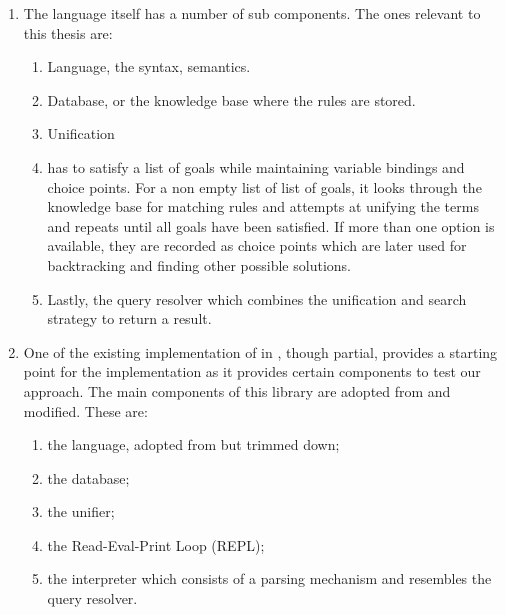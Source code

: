 \documentclass[thesis-solanki.tex]{subfiles}
\begin{document}
\begin{enumerate}
\item {}

The language itself has a number of sub components.
The ones relevant to this thesis are:
\begin{enumerate}
\item Language, the syntax, semantics.

\item Database, or the knowledge base where the rules are stored.

\item Unification

\item
   has to satisfy a list of goals while maintaining variable bindings and choice points.
  For a non empty list of list of goals, it looks through the knowledge base for matching rules and attempts at
  unifying the terms and repeats until all goals have been satisfied.
  If more than one option is available, they are recorded as choice points which are later used for backtracking
  and finding other possible solutions.

\item
  Lastly, the query resolver which combines the unification and search strategy to return a result.
\end{enumerate}

\item {} \cite{prolog-lib}

  One of the existing implementation of  in , though partial, provides a
  starting point for the implementation as it provides certain components to test our approach.
  The main components of this library are adopted from  and modified.
  These are:

\begin{enumerate}
\item the language, adopted from  but trimmed down;

\item the database;

\item the unifier;

\item the Read-Eval-Print Loop (REPL);

\item the interpreter which consists of a parsing mechanism and resembles the query resolver.
\end{enumerate}


\end{enumerate}
\end{document}
